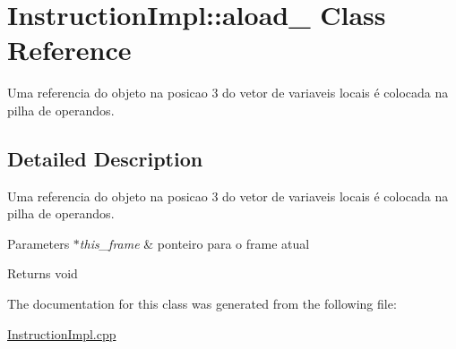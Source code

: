 \hypertarget{class_instruction_impl_1_1aload__3}{}\section{Instruction\+Impl\+:\+:aload\+\_ Class Reference}
\label{class_instruction_impl_1_1aload__3}


Uma referencia do objeto na posicao 3 do vetor de variaveis locais é colocada na pilha de operandos.  




\subsection{Detailed Description}
Uma referencia do objeto na posicao 3 do vetor de variaveis locais é colocada na pilha de operandos. 


\begin{DoxyParams}{Parameters}
{\em $\ast$this\+\_\+frame} & ponteiro para o frame atual \\
\hline
\end{DoxyParams}
\begin{DoxyReturn}{Returns}
void 
\end{DoxyReturn}


The documentation for this class was generated from the following file\+:\begin{DoxyCompactItemize}
\item 
\hyperlink{_instruction_impl_8cpp}{Instruction\+Impl.\+cpp}\end{DoxyCompactItemize}
